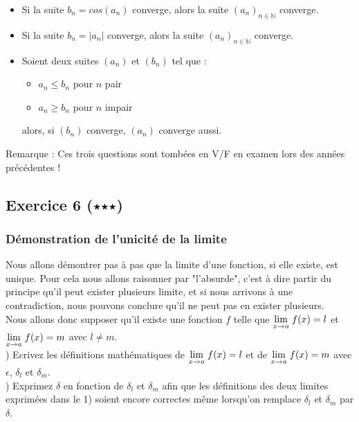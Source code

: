 \documentclass{article}
\newcommand{\Lim}[1]{\raisebox{0.0ex}{\scalebox{1}{$\displaystyle \lim_{#1}\;$}}}
\begin{document}
\begin{itemize}
    \item Si la suite $b_n = cos(a_n)$ converge, alors la suite $(a_n)_{n \in \mathbb{N}}$ converge.
    \item Si la suite $b_n = \lvert a_n \rvert$ converge, alors la suite $(a_n)_{n \in \mathbb{N}}$ converge.
    \item Soient deux suites $(a_n)$ et $(b_n)$ tel que :
    \begin{itemize}
        \item $a_n \leq b_n$ pour $n$ pair
        \item $a_n \geq b_n$ pour $n$ impair
    \end{itemize}
    alors, si $(b_n)$ converge, $(a_n)$ converge aussi.
\end{itemize}
Remarque : Ces trois questions sont tombées en V/F en examen lors des années précédentes !

\subsection*{Exercice 6 ($\medblackstar \medblackstar \medblackstar$)}

\subsubsection*{Démonstration de l'unicité de la limite}

Nous allons démontrer pas à pas que la limite d'une fonction, si elle existe, est unique. Pour cela nous allons raisonner par "l'absurde", c'est à dire partir du principe qu'il peut exister plusieurs limite, et si nous arrivons à une contradiction, nous pouvons conclure qu'il ne peut pas en exister plusieurs.\\

\noindent Nous allons donc supposer qu'il existe une fonction $f$ telle que $\Lim{x \to a} f(x) = l$ et $\Lim{x \to a} f(x) = m$ avec $l \neq m$.\\

) Ecrivez les définitions mathématiques de $\Lim{x \to a} f(x) = l$ et de $\Lim{x \to a} f(x) = m$ avec $\epsilon$, $\delta_l$ et $\delta_m$.\\

) Exprimez $\delta$ en fonction de $\delta_l$ et $\delta_m$ afin que les définitions des deux limites exprimées dans le 1) soient encore correctes même lorsqu'on remplace $\delta_l$ et $\delta_m$ par $\delta$.\\
\end{document}
